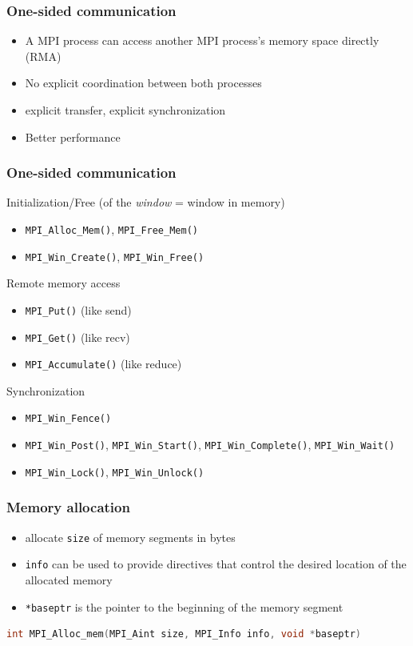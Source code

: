 \begin{frame}[containsverbatim]
\frametitle{One-sided communication}
\begin{itemize}
	\item {A MPI process can access another MPI process's memory space directly (RMA)}
	\item {No explicit coordination between both processes}
	\item {explicit transfer, explicit synchronization}
	\item {Better performance}
\end{itemize}
\end{frame}

\begin{frame}[containsverbatim]
\frametitle{One-sided communication}
Initialization/Free (of the \textit{window} = window in memory)
\begin{itemize}
	\item {\verb+MPI_Alloc_Mem()+, \verb+MPI_Free_Mem()+}
	\item {\verb+MPI_Win_Create()+, \verb+MPI_Win_Free()+}
\end{itemize}
Remote memory access
\begin{itemize}
	\item {\verb+MPI_Put()+ (like send)}
	\item {\verb+MPI_Get()+ (like recv)}
	\item {\verb+MPI_Accumulate()+ (like reduce)}
\end{itemize}
Synchronization
\begin{itemize}
	\item {\verb+MPI_Win_Fence()+}
	\item {\verb+MPI_Win_Post()+, \verb+MPI_Win_Start()+, \verb+MPI_Win_Complete()+, \verb+MPI_Win_Wait()+}
	\item {\verb+MPI_Win_Lock()+, \verb+MPI_Win_Unlock()+}
\end{itemize}

\end{frame}

\begin{frame}[containsverbatim]
\frametitle{Memory allocation}
\begin{itemize}
	\item {allocate \verb+size+ of memory segments in bytes}
	\item {\verb+info+ can be used to provide directives that control the desired location of the allocated memory}
	\item {\verb+*baseptr+ is the pointer to the beginning of the memory segment}
\end{itemize}

\begin{lstlisting}[language=C,frame=lines]
int MPI_Alloc_mem(MPI_Aint size, MPI_Info info, void *baseptr)
\end{lstlisting}

\end{frame}



